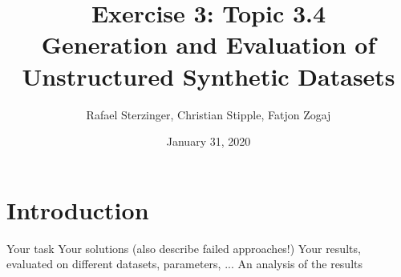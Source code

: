 \documentclass{article}
\title{Exercise 3: Topic 3.4\\ Generation and Evaluation of Unstructured Synthetic Datasets}
\author{Rafael Sterzinger, Christian Stipple, Fatjon Zogaj}
\date{January 31, 2020}
\begin{document}
\maketitle

\section{Introduction}


Your task
Your solutions (also describe failed approaches!)
Your results, evaluated on different datasets, parameters, ...
An analysis of the results

\end{document}
